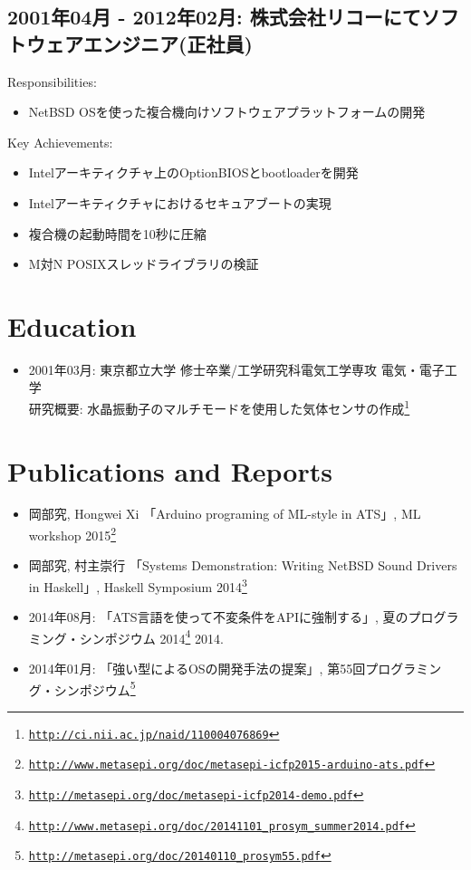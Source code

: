 \documentclass[letterpaper]{article}
\begin{document}
\subsection*{2001年04月 - 2012年02月: 株式会社リコーにてソフトウェアエンジニア(正社員)}

\noindent Responsibilities:

\begin{itemize}
  \item NetBSD OSを使った複合機向けソフトウェアプラットフォームの開発
\end{itemize}

\noindent Key Achievements:

\begin{itemize}
  \item Intelアーキティクチャ上のOptionBIOSとbootloaderを開発
  \item Intelアーキティクチャにおけるセキュアブートの実現
  \item 複合機の起動時間を10秒に圧縮
  \item M対N POSIXスレッドライブラリの検証
\end{itemize}

\section*{Education}

\begin{itemize}
  \item 2001年03月: 東京都立大学 修士卒業/工学研究科電気工学専攻 電気・電子工学 \\
    研究概要: 水晶振動子のマルチモードを使用した気体センサの作成\footnote{\href{http://ci.nii.ac.jp/naid/110004076869}{\tt http://ci.nii.ac.jp/naid/110004076869}}
\end{itemize}

\section*{Publications and Reports}

\begin{itemize}
  \item 岡部究, Hongwei Xi 「Arduino programing of ML-style in ATS」, ML workshop 2015\footnote{\href{http://www.metasepi.org/doc/metasepi-icfp2015-arduino-ats.pdf}{\tt http://www.metasepi.org/doc/metasepi-icfp2015-arduino-ats.pdf}}
  \item 岡部究, 村主崇行 「Systems Demonstration: Writing NetBSD Sound Drivers in Haskell」, Haskell Symposium 2014\footnote{\href{http://metasepi.org/doc/metasepi-icfp2014-demo.pdf}{\tt http://metasepi.org/doc/metasepi-icfp2014-demo.pdf}}
  \item 2014年08月: 「ATS言語を使って不変条件をAPIに強制する」, 夏のプログラミング・シンポジウム 2014\footnote{\href{http://www.metasepi.org/doc/20141101\_prosym\_summer2014.pdf}{\tt http://www.metasepi.org/doc/20141101\_prosym\_summer2014.pdf}}  2014.
  \item 2014年01月: 「強い型によるOSの開発手法の提案」, 第55回プログラミング・シンポジウム\footnote{\href{http://metasepi.org/doc/20140110\_prosym55.pdf}{\tt http://metasepi.org/doc/20140110\_prosym55.pdf}}
\end{itemize}
\end{document}
